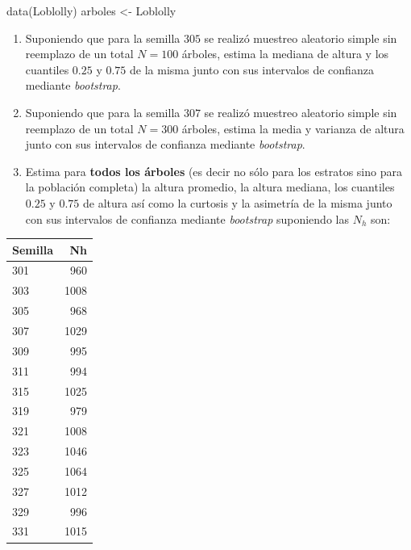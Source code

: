 \documentclass[
]{book}
\newenvironment{Shaded}{\begin{snugshade}}{\end{snugshade}}
\newcommand{\FunctionTok}[1]{\textcolor[rgb]{0.00,0.00,0.00}{#1}}
\newcommand{\NormalTok}[1]{#1}
\newcommand{\OtherTok}[1]{\textcolor[rgb]{0.56,0.35,0.01}{#1}}
\begin{document}
\begin{Shaded}
\begin{Highlighting}[]
\FunctionTok{data}\NormalTok{(Loblolly)}
\NormalTok{arboles }\OtherTok{\textless{}{-}}\NormalTok{ Loblolly}
\end{Highlighting}
\end{Shaded}

\begin{enumerate}
\def\labelenumi{\arabic{enumi}.}
\item
  Suponiendo que para la semilla \(305\) se realizó muestreo aleatorio simple sin reemplazo de un total \(N = 100\) árboles, estima la mediana de altura y los cuantiles \(0.25\) y \(0.75\) de la misma junto con sus intervalos de confianza mediante \emph{bootstrap}.
\item
  Suponiendo que para la semilla \(307\) se realizó muestreo aleatorio simple sin reemplazo de un total \(N = 300\) árboles, estima la media y varianza de altura junto con sus intervalos de confianza mediante \emph{bootstrap}.
\item
  Estima para \textbf{todos los árboles} (es decir no sólo para los estratos sino para la población completa) la altura promedio, la altura mediana, los cuantiles \(0.25\) y \(0.75\) de altura así como la curtosis y la asimetría de la misma junto con sus intervalos de confianza mediante \emph{bootstrap} suponiendo las \(N_h\) son:
\end{enumerate}

\begin{table}
\centering
\begin{tabular}{l|r}
\hline
Semilla & Nh\\
\hline
301 & 960\\
\hline
303 & 1008\\
\hline
305 & 968\\
\hline
307 & 1029\\
\hline
309 & 995\\
\hline
311 & 994\\
\hline
315 & 1025\\
\hline
319 & 979\\
\hline
321 & 1008\\
\hline
323 & 1046\\
\hline
325 & 1064\\
\hline
327 & 1012\\
\hline
329 & 996\\
\hline
331 & 1015\\
\hline
\end{tabular}
\end{table}
\end{document}
